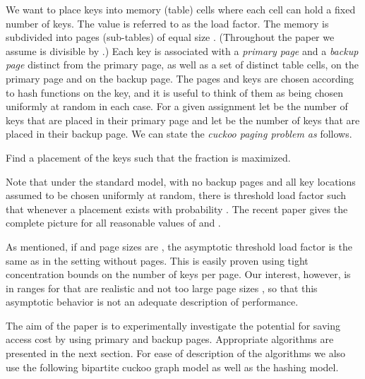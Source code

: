 \let\accentvec\vec \documentclass{llncs}
\begin{document}
We want to place  keys into  memory (table) cells where each cell can hold a fixed number of  keys.  The value  is referred to 
as the load factor.  
The memory is subdivided into  pages (sub-tables) of equal size .  (Throughout the paper we assume
 is divisible by .)  Each key is associated with a \emph{primary page} 
and a \emph{backup page} distinct from the primary page, as well as a set of  distinct table cells,  on the primary page and  on the backup page.  The pages and keys are chosen according to hash functions on the key, and it is useful to think of them as being chosen uniformly at random in each case. 
For a given assignment let  be the number of keys that are placed in their primary page and let  be the number of keys that are placed in their backup page. We can state the \emph{cuckoo paging problem as} follows.

\begin{prob}
Find a placement of the  keys such that the fraction  is maximized.
\end{prob}
\begin{remark}
Note that under the standard model, with no backup pages and all key locations
assumed to be chosen uniformly at random, there is threshold load factor  such that whenever  a placement exists with probability . The recent paper \cite{fountoulakis2011multiple} gives the complete picture for all reasonable values of  and .
\end{remark}


\begin{remark}As mentioned, if  and page sizes are ,
the asymptotic threshold load factor is the same as in the setting without pages.
This is easily proven using tight concentration bounds on the number of keys per page.
Our interest, however, is in ranges for  that are realistic and not too
large page sizes , so that this asymptotic behavior is not an adequate description of performance.
\end{remark}

The aim of the paper is to experimentally investigate the potential
for saving access cost by using primary and backup pages. Appropriate
algorithms are presented in the next section. For ease of description
of the algorithms we also use the following bipartite cuckoo graph model as well as the
hashing model.
\end{document}
